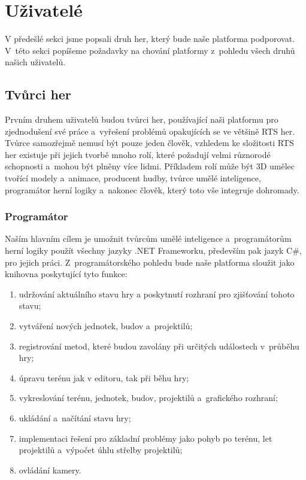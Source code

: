\section{Uživatelé}
V předešlé sekci jsme popsali druh her, který bude naše platforma podporovat. V~této sekci popíšeme požadavky na chování platformy z~pohledu všech druhů našich uživatelů.

\subsection{Tvůrci her}
Prvním druhem uživatelů budou tvůrci her, používající naši platformu pro zjednodušení své práce a~vyřešení problémů opakujících se ve většině RTS her. Tvůrce samozřejmě nemusí být pouze jeden člověk, vzhledem ke složitosti RTS her existuje při jejich tvorbě mnoho rolí, které požadují velmi různorodé schopnosti a~mohou být plněny více lidmi. Příkladem rolí může být 3D umělec tvořící modely a~animace, producent hudby, tvůrce umělé inteligence, programátor herní logiky a~nakonec člověk, který toto vše integruje dohromady.

\subsubsection{Programátor}
Naším hlavním cílem je umožnit tvůrcům umělé inteligence a~programátorům herní logiky použít všechny jazyky .NET Frameworku, především pak jazyk C\#, pro jejich práci. Z~programátorského pohledu bude naše platforma sloužit jako knihovna poskytující tyto funkce:

\begin{enumerate}
	\item udržování aktuálního stavu hry a poskytnutí rozhraní pro zjišťování tohoto stavu;
	\item vytváření nových jednotek, budov a~projektilů;
	\item registrování metod, které budou zavolány při určitých událostech v~průběhu hry;
	\item úpravu terénu jak v editoru, tak při běhu hry;
	\item vykreslování terénu, jednotek, budov, projektilů a~grafického rozhraní;
	\item ukládání a~načítání stavu hry;
	\item implementaci řešení pro základní problémy jako pohyb po terénu, let projektilů a~výpočet úhlu střelby projektilů;
	\item ovládání kamery.
\end{enumerate}

